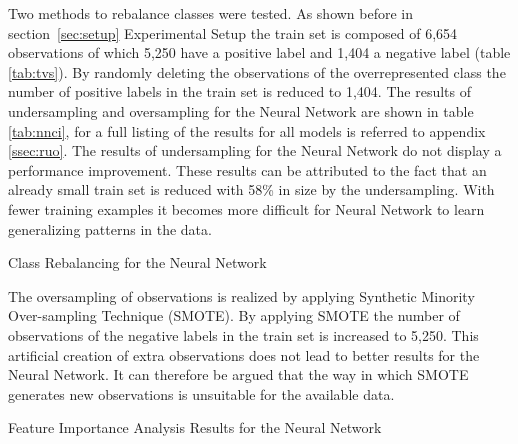 Two methods to rebalance classes were tested. 
As shown before in section~\ref{sec:setup} Experimental Setup the train set is composed of 6,654 observations of which 5,250 have a positive label and 1,404 a negative label (table \ref{tab:tvs}).
By randomly deleting the observations of the overrepresented class the number of positive labels in the train set is reduced to 1,404.
The results of undersampling and oversampling for the Neural Network are shown in table \ref{tab:nnci}, for a full listing of the results for all models is referred to appendix \ref{ssec:ruo}.
The results of undersampling for the Neural Network do not display a performance improvement.
These  results can be attributed to the fact that an already small train set is reduced with 58\% in size by the undersampling.
With fewer training examples it becomes more difficult for Neural Network to learn generalizing patterns in the data.

\begin{table}[h]
\begin{footnotesize}

\end{footnotesize}
\caption{\footnotesize{\label{tab:nnci} Class Rebalancing for the Neural Network}}
\end{table}

The oversampling of observations is realized by applying Synthetic Minority Over-sampling Technique (SMOTE). 
By applying SMOTE the number of observations of the negative labels in the train set is increased to 5,250. 
This artificial creation of extra observations does not lead to better results for the Neural Network.
It can therefore be argued that the way in which SMOTE generates new observations is unsuitable for the available data.

\begin{table}[h]
\begin{footnotesize}

\end{footnotesize}
\caption{\label{tab:nnfi} \footnotesize{Feature Importance Analysis Results for the Neural Network}}
\end{table}

